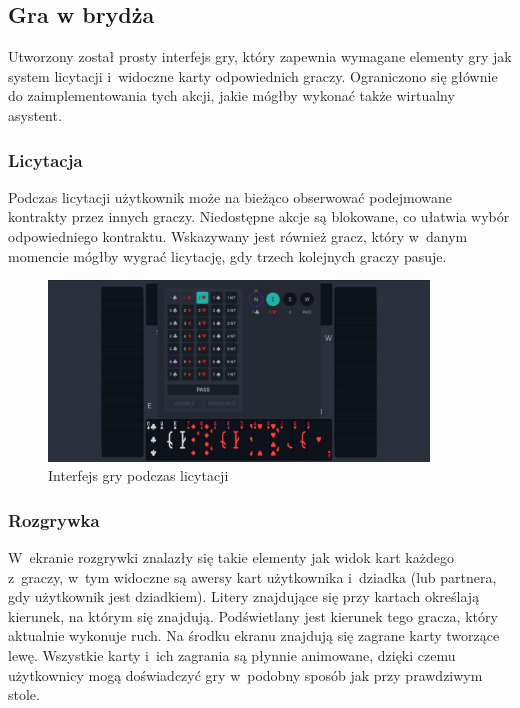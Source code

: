 \subsection{Gra w brydża}

Utworzony został prosty interfejs gry, który zapewnia
wymagane elementy gry jak system licytacji i~widoczne
karty odpowiednich graczy. Ograniczono się głównie do
zaimplementowania tych akcji, jakie mógłby wykonać także
wirtualny asystent.

\subsubsection{Licytacja}

Podczas licytacji użytkownik może na bieżąco obserwować
podejmowane kontrakty przez innych graczy. Niedostępne akcje
są blokowane, co ułatwia wybór odpowiedniego kontraktu.
Wskazywany jest również gracz, który w~danym momencie
mógłby wygrać licytację, gdy trzech kolejnych graczy
pasuje.

\begin{figure}[h!]
  \centering
  \includegraphics[width=0.9\textwidth]{img/widoki/bidding.png}
  \caption{Interfejs gry podczas licytacji}
  \label{fig:bidding}
\end{figure}

\FloatBarrier

\subsubsection{Rozgrywka}

W~ekranie rozgrywki znalazły się takie elementy jak widok
kart każdego z~graczy, w~tym widoczne są awersy kart
użytkownika i~dziadka (lub partnera, gdy użytkownik jest
dziadkiem). Litery znajdujące się przy kartach określają
kierunek, na którym się znajdują. Podświetlany jest
kierunek tego gracza, który aktualnie wykonuje ruch.
Na środku ekranu znajdują się zagrane karty tworzące lewę.
Wszystkie karty i~ich zagrania są płynnie animowane,
dzięki czemu użytkownicy mogą doświadczyć gry
w~podobny sposób jak przy prawdziwym stole.

